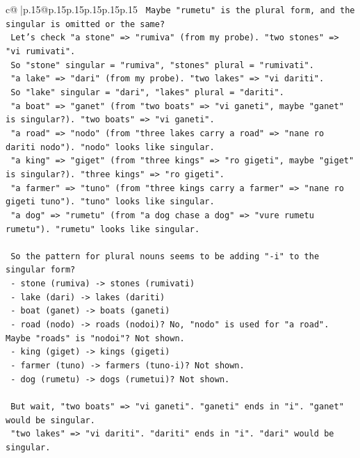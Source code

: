 \documentclass{article}
\begin{document}
{\begin{supertabular}{c@{$\;$}|p{.15\linewidth}@{}p{.15\linewidth}p{.15\linewidth}p{.15\linewidth}p{.15\linewidth}p{.15\linewidth}}
{{{\texttt{   Maybe "rumetu" is the plural form, and the singular is omitted or the same?} \\
\texttt{   Let's check "a stone" => "rumiva" (from my probe). "two stones" => "vi rumivati".} \\
\texttt{   So "stone" singular = "rumiva", "stones" plural = "rumivati".} \\
\texttt{   "a lake" => "dari" (from my probe). "two lakes" => "vi dariti".} \\
\texttt{   So "lake" singular = "dari", "lakes" plural = "dariti".} \\
\texttt{   "a boat" => "ganet" (from "two boats" => "vi ganeti", maybe "ganet" is singular?). "two boats" => "vi ganeti".} \\
\texttt{   "a road" => "nodo" (from "three lakes carry a road" => "nane ro dariti nodo"). "nodo" looks like singular.} \\
\texttt{   "a king" => "giget" (from "three kings" => "ro gigeti", maybe "giget" is singular?). "three kings" => "ro gigeti".} \\
\texttt{   "a farmer" => "tuno" (from "three kings carry a farmer" => "nane ro gigeti tuno"). "tuno" looks like singular.} \\
\texttt{   "a dog" => "rumetu" (from "a dog chase a dog" => "vure rumetu rumetu"). "rumetu" looks like singular.} \\
\\ 
\texttt{   So the pattern for plural nouns seems to be adding "{-}i" to the singular form?} \\
\texttt{   {-} stone (rumiva) {-}> stones (rumivati)} \\
\texttt{   {-} lake (dari) {-}> lakes (dariti)} \\
\texttt{   {-} boat (ganet) {-}> boats (ganeti)} \\
\texttt{   {-} road (nodo) {-}> roads (nodoi)? No, "nodo" is used for "a road". Maybe "roads" is "nodoi"? Not shown.} \\
\texttt{   {-} king (giget) {-}> kings (gigeti)} \\
\texttt{   {-} farmer (tuno) {-}> farmers (tuno{-}i)? Not shown.} \\
\texttt{   {-} dog (rumetu) {-}> dogs (rumetui)? Not shown.} \\
\\ 
\texttt{   But wait, "two boats" => "vi ganeti". "ganeti" ends in "i". "ganet" would be singular.} \\
\texttt{   "two lakes" => "vi dariti". "dariti" ends in "i". "dari" would be singular.} \\
}}}
\end{supertabular}}
\end{document}
